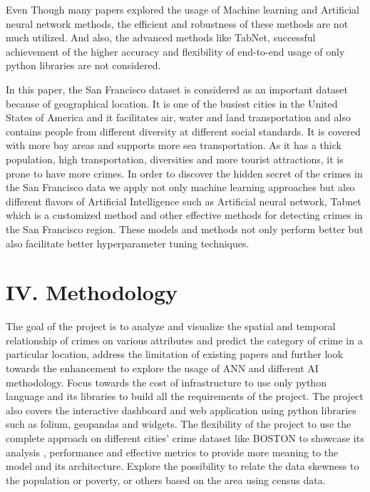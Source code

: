 \documentclass[11 pt,conference,final,]{IEEEtran}
\begin{document}
Even Though many papers explored the usage of Machine learning and
Artificial neural network methods, the efficient and robustness of these
methods are not much utilized. And also, the advanced methods like
TabNet, successful achievement of the higher accuracy and flexibility of
end-to-end usage of only python libraries are not considered.

In this paper, the San Francisco dataset is considered as an important
dataset because of geographical location. It is one of the busiest
cities in the United States of America and it facilitates air, water and
land transportation and also contains people from different diversity at
different social standards. It is covered with more bay areas and
supports more sea transportation. As it has a thick population, high
transportation, diversities and more tourist attractions, it is prone to
have more crimes. In order to discover the hidden secret of the crimes
in the San Francisco data we apply not only machine learning approaches
but also different flavors of Artificial Intelligence such as Artificial
neural network, Tabnet which is a customized method and other effective
methods for detecting crimes in the San Francisco region. These models
and methods not only perform better but also facilitate better
hyperparameter tuning techniques.

\section{IV. Methodology}\label{iv.-methodology}

The goal of the project is to analyze and visualize the spatial and
temporal relationship of crimes on various attributes and predict the
category of crime in a particular location, address the limitation of
existing papers and further look towards the enhancement to explore the
usage of ANN and different AI methodology. Focus towards the cost of
infrastructure to use only python language and its libraries to build
all the requirements of the project. The project also covers the
interactive dashboard and web application using python libraries such as
folium, geopandas and widgets. The flexibility of the project to use the
complete approach on different cities' crime dataset like BOSTON to
showcase its analysis , performance and effective metrics to provide
more meaning to the model and its architecture. Explore the possibility
to relate the data skewness to the population or poverty, or others
based on the area using census data.
\end{document}
